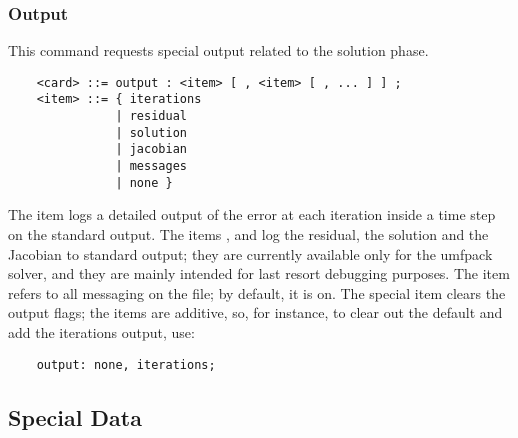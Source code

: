 \subsubsection{Output}
This command requests special output related to the solution phase.
\begin{verbatim}
    <card> ::= output : <item> [ , <item> [ , ... ] ] ;
    <item> ::= { iterations
               | residual
               | solution
               | jacobian
               | messages
               | none }
\end{verbatim}
The item  logs a detailed output of the error
at each iteration inside a time step 
on the standard output.
The items ,  and  log
the residual, the solution and the Jacobian to standard output; they are
currently available only for the umfpack solver, and they are
mainly intended for last resort debugging purposes.
The item  refers to all messaging 
on the  file; by default, it is on.
The special item  clears the output flags; the items
are additive, so, for instance, to clear out the default 
and add the iterations output, use:
\begin{verbatim}
    output: none, iterations;
\end{verbatim}

\subsection{Special Data}
